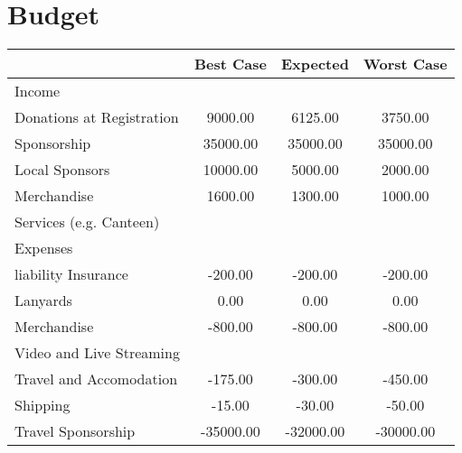 
\section{Budget}

 
\begin{tabularx}{\linewidth}{XSSS}
   & {Best Case} & {Expected} & {Worst Case} \\
  \hline\hline
Income \hspace*{1em}  & {} & {} & {}\\
\hspace*{1em} Donations at Registration  & 9000.00 & 6125.00 & 3750.00\\
\hspace*{1em} Sponsorship  & 35000.00 & 35000.00 & 35000.00\\
\hspace*{1em} Local Sponsors  & 10000.00 & 5000.00 & 2000.00\\
\hspace*{1em} Merchandise  & 1600.00 & 1300.00 & 1000.00\\
\hspace*{1em} Services (e.g. Canteen)  & {} & {} & {}\\[0.5ex]
Expenses \hspace*{1em}  & {} & {} & {}\\
\hspace*{1em} liability Insurance  & -200.00 & -200.00 & -200.00\\
\hspace*{1em} Lanyards  & 0.00 & 0.00 & 0.00\\
\hspace*{1em} Merchandise  & -800.00 & -800.00 & -800.00\\
\hspace*{1em} Video and Live Streaming  & {} & {} & {}\\
\hspace*{1em} \hspace*{1em} Travel and Accomodation & -175.00 & -300.00 & -450.00\\
\hspace*{1em} \hspace*{1em} Shipping & -15.00 & -30.00 & -50.00\\
\hspace*{1em} Travel Sponsorship  & -35000.00 & -32000.00 & -30000.00\\

\end{tabularx}
